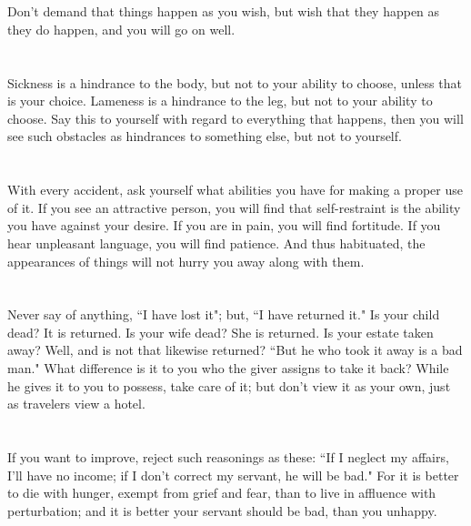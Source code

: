 \documentclass[12pt]{article}
\begin{document}
\section{}

Don't demand that things happen as you wish, but wish that they
happen as they do happen, and you will go on well. 

\section{}

Sickness is a hindrance to the body, but not to your ability to
choose, unless that is your choice. Lameness is a hindrance to the
leg, but not to your ability to choose. Say this to yourself with
regard to everything that happens, then you will see such obstacles
as hindrances to something else, but not to yourself. 

\section{}

With every accident, ask yourself what abilities you have for
making a proper use of it. If you see an attractive person, you will
find that self-restraint is the ability you have against your desire.
If you are in pain, you will find fortitude. If you hear unpleasant
language, you will find patience. And thus habituated, the appearances
of things will not hurry you away along with them. 

\section{}

Never say of anything, ``I have lost it"; but, ``I have returned
it." Is your child dead? It is returned. Is your wife dead? She is
returned. Is your estate taken away? Well, and is not that likewise
returned? ``But he who took it away is a bad man." What difference
is it to you who the giver assigns to take it back? While he gives
it to you to possess, take care of it; but don't view it as your own,
just as travelers view a hotel. 

\section{}

If you want to improve, reject such reasonings as these: ``If I
neglect my affairs, I'll have no income; if I don't correct my servant,
he will be bad." For it is better to die with hunger, exempt from
grief and fear, than to live in affluence with perturbation; and it
is better your servant should be bad, than you unhappy. 
\end{document}
